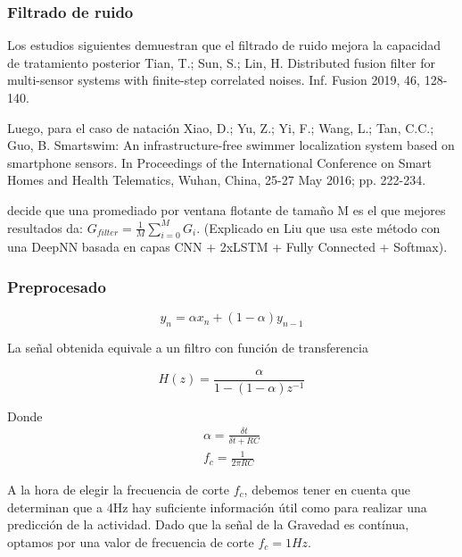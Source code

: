 \documentclass[../tfm.tex]{subfiles}
\begin{document}
\subsubsection{Filtrado de ruido}
Los estudios siguientes demuestran que el filtrado de ruido mejora la capacidad de tratamiento posterior
Tian, T.; Sun, S.; Lin, H. Distributed fusion filter for multi-sensor systems with finite-step correlated noises. Inf. Fusion 2019, 46, 128-140.

Luego, para el caso de natación
Xiao, D.; Yu, Z.; Yi, F.; Wang, L.; Tan, C.C.; Guo, B. Smartswim: An infrastructure-free swimmer localization system based on smartphone sensors. In Proceedings of the International Conference on Smart Homes and Health Telematics, Wuhan, China, 25-27 May 2016; pp. 222-234.

decide que una promediado por ventana flotante de tamaño M es el que mejores resultados da: $G_{filter}=\frac{1}{M}\sum_{i=0}^{M}G_i$. (Explicado en Liu \cite{Liu2020} que usa este método con una DeepNN basada en capas CNN + 2xLSTM + Fully Connected + Softmax).


\subsubsection{Preprocesado}


\[
  y_n = \alpha x_n + (1-\alpha) y_{n-1}
\]

La señal obtenida equivale a un filtro con función de transferencia

\[
  H(z) = \frac{\alpha}{1-(1-\alpha)z^{-1}}
\]

Donde
\begin{align*}
\alpha = \frac{\delta t}{\delta t + RC} \\
f_c= \frac{1}{2 \pi RC}
\end{align*}

A la hora de elegir la frecuencia de corte $f_c$, debemos tener en cuenta que determinan que a 4Hz hay suficiente información útil como para realizar una predicción de la actividad. Dado que la señal de la Gravedad es contínua, optamos por una valor de frecuencia de corte $f_c=1Hz$.
\end{document}
